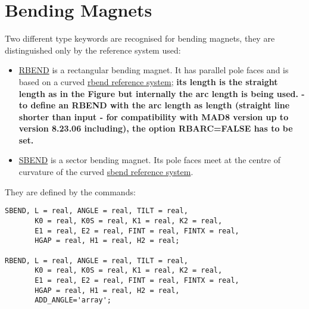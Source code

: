 
\section{Bending Magnets}

Two different type keywords are recognised for bending magnets, they are
distinguished only by the reference system used:  
\begin{itemize}
   \item \href{rbend}{RBEND} is a rectangular bending magnet. It has
     parallel pole faces and is based on a curved
     \href{local_system.html#rbend}{rbend reference system};  \textbf{
       its length is the straight length as in the Figure but internally
       the arc length is being used.  - to define an RBEND with the arc
       length as length (straight line shorter than input - for
       compatibility with MAD8 version up to version 8.23.06 including),
       the option RBARC=FALSE has to be set.} 
   \item \href{sbend}{SBEND} is a sector bending magnet. Its pole faces
     meet at the centre of curvature of the curved
     \href{local_system.html#sbend}{sbend reference system}.  
\end{itemize} 

They are defined by the commands: 
\begin{verbatim}
SBEND, L = real, ANGLE = real, TILT = real, 
       K0 = real, K0S = real, K1 = real, K2 = real, 
       E1 = real, E2 = real, FINT = real, FINTX = real, 
       HGAP = real, H1 = real, H2 = real;

RBEND, L = real, ANGLE = real, TILT = real, 
       K0 = real, K0S = real, K1 = real, K2 = real, 
       E1 = real, E2 = real, FINT = real, FINTX = real,
       HGAP = real, H1 = real, H2 = real,
       ADD_ANGLE='array';
\end{verbatim} 

